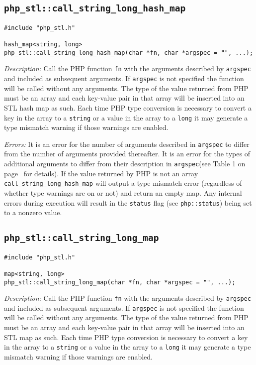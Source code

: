 \documentclass[11pt,titlepage]{article}
\begin{document}
\subsection{\texttt{php\_stl::call\_string\_long\_hash\_map}}

\begin{verbatim}
#include "php_stl.h"

hash_map<string, long> 
php_stl::call_string_long_hash_map(char *fn, char *argspec = "", ...);
\end{verbatim}

\emph{Description:} Call the PHP function \verb|fn| with the arguments described by \verb|argspec| and included as subsequent arguments. If \verb|argspec| is not specified the function will be called without any arguments. The type of the value returned from PHP must be an array and each key-value pair in that array will be inserted into an STL hash map as such. Each time PHP type conversion is necessary to convert a key in the array to a \verb|string| or a value in the array to a \verb|long| it may generate a type mismatch warning if those warnings are enabled.

\emph{Errors:} It is an error for the number of arguments described in \verb|argspec| to differ from the number of arguments provided thereafter. It is an error for the types of additional arguments to differ from their description in \verb|argspec|(see Table 1 on page~\pageref{Table1} for details). If the value returned by PHP is not an array \verb|call_string_long_hash_map| will output a type mismatch error (regardless of whether type warnings are on or not) and return an empty map. Any internal errors during execution will result in the \verb|status| flag (see \verb|php::status|) being set to a nonzero value.


\subsection{\texttt{php\_stl::call\_string\_long\_map}}

\begin{verbatim}
#include "php_stl.h"

map<string, long> 
php_stl::call_string_long_map(char *fn, char *argspec = "", ...);
\end{verbatim}

\emph{Description:} Call the PHP function \verb|fn| with the arguments described by \verb|argspec| and included as subsequent arguments. If \verb|argspec| is not specified the function will be called without any arguments. The type of the value returned from PHP must be an array and each key-value pair in that array will be inserted into an STL map as such. Each time PHP type conversion is necessary to convert a key in the array to a \verb|string| or a value in the array to a \verb|long| it may generate a type mismatch warning if those warnings are enabled.
\end{document}
